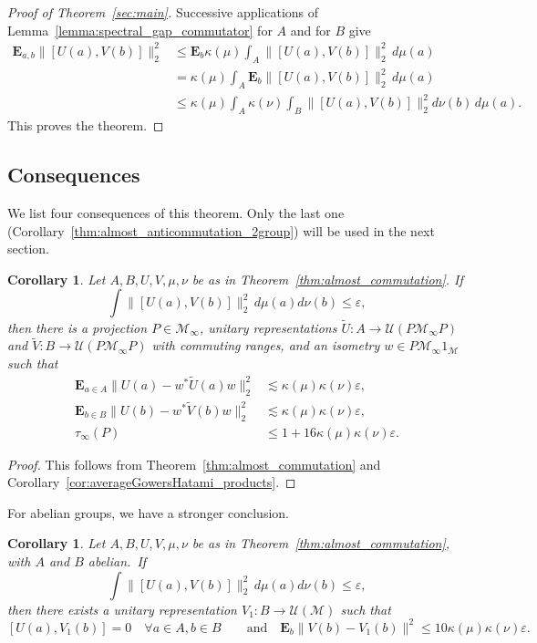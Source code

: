 \documentclass[10pt]{amsart}
\theoremstyle{plain}
\newtheorem{corollary}[theorem]{Corollary}
\theoremstyle{definition}
\newcommand{\cM}{\mathcal{M}}
\newcommand{\E}{\mathbf{E}}
\newcommand{\cU}{\mathcal{U}}
\begin{document}
\begin{proof}[Proof of Theorem~\ref{sec:main}] Successive applications of Lemma~\ref{lemma:spectral_gap_commutator} for $A$ and for $B$ give
\begin{align*}\E_{a,b} \|[U(a),V(b)]\|_2^2 & \leq \E_b \kappa(\mu) \int_A \|[U(a),V(b)]\|_2^2 \,d\mu(a)\\
& = \kappa(\mu) \int_A \E_b \|[U(a),V(b)]\|_2^2 \,d\mu(a)\\
& \leq \kappa(\mu) \int_A \kappa(\nu) \int_B \|[U(a),V(b)]\|_2^2 d\nu(b) \,d\mu(a).
\end{align*}
This proves the theorem.
\end{proof}

\subsection{Consequences}
We list four consequences of this theorem. Only the last one (Corollary~\ref{thm:almost_anticommutation_2group}) will be used in the next section.
\begin{corollary} Let $A,B,U,V,\mu,\nu$ be as in Theorem~\ref{thm:almost_commutation}. If
\[
\int \| [U(a),V(b)]\|_2^2 \,d\mu(a) d\nu(b) \leq \varepsilon,
\]
then there is a projection $P \in \cM_\infty$, unitary representations $\tilde{U}: A \to \cU(P\cM_\infty P)$ and $\tilde{V}: B \to \cU(P\cM_\infty P)$ with commuting ranges, and an isometry $w \in P \cM_\infty 1_\cM$ such that
\begin{align*}
\E_{a \in A} \|U(a)-w^* \tilde U(a) w\|_2^2&\lesssim \kappa(\mu)\kappa(\nu)\varepsilon,
\\
\E_{b \in B} \|U(b)-w^* \tilde V(b) w\|_2^2&\lesssim \kappa(\mu)\kappa(\nu)\varepsilon,
\\
\tau_\infty(P)&\leq 1+ 16\kappa(\mu)\kappa(\nu) \varepsilon.
\end{align*}
\end{corollary}
\begin{proof}
This follows from Theorem~\ref{thm:almost_commutation} and
Corollary~\ref{cor:averageGowersHatami_products}.\end{proof} For
abelian groups, we have a stronger conclusion.
\begin{corollary}\label{thm:almost_commutationbis}
Let $A,B,U,V,\mu,\nu$ be as in Theorem~\ref{thm:almost_commutation}, with $A$ and $B$ abelian.~If
\[
\int \|[U(a),V(b)]\|_2^2 \,d\mu(a) d\nu(b) \leq \varepsilon,
\]
then there exists a unitary representation $V_1:B \to \cU(\cM)$ such that
\[
[U(a),V_1(b)] = 0 \quad \forall a \in A,b\in B
\qquad
\text{and}
\quad
\E_b \|V(b) - V_1(b)\|^2 \leq 10\kappa(\mu) \kappa(\nu) \varepsilon.
\]
\end{corollary}
\end{document}
